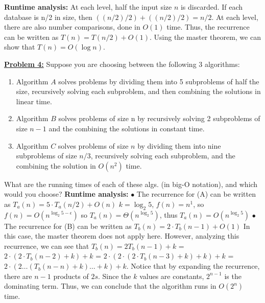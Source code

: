 \documentclass[11pt]{article}
\begin{document}
\begin{flushleft}
		\newline
		\newline
		\textbf{Runtime analysis:} At each level, half the input size $n$ is discarded. If each database is n/2 in size, then $((n/2) / 2) + ((n/2) / 2) = n/2$. At each level, there are also number comparisons, done in $O(1)$ time. Thus, the recurrence can be written as $T(n) = T(n/2) + O(1)$. Using the master theorem, we can show that $T(n) = O(\log n)$.
		\newline
		\item \textbf {\underline{Problem 4:}} Suppose you are choosing between the following 3 algorithms:
		\begin{enumerate}
			\item Algorithm $A$ solves problems by dividing them into 5 subproblems of half the size, recursively solving each subproblem, and then combining the solutions in linear time.
			\item Algorithm $B$ solves problems of size n by recursively solving 2 subproblems of size $n-1$ and the combining the solutions in constant time.
			\item Algorithm $C$ solves problems of size $n$ by dividing them into nine subproblems of size $n/3$, recursively solving each subproblem, and the combining the solution in $O(n^2)$ time.
		\end{enumerate}
		What are the running times of each of these algs. (in big-O notation), and which would you choose?
		\newline
		\newpage
		\textbf{Runtime analysis:} 
		\newline
		$\bullet$ The recurrence for (A) can be written as $T_a(n) = 5 \cdot T_a(n/2) + O(n)$
		\newline
		$k = \log_2 5$, $f(n) = n^1$, so $f(n) = O(n^{\log_2 5 - \epsilon})$ so
		$T_a(n) = \Theta(n^{\log_2 5})$, thus $T_a(n) = O(n^{\log_2 5})$
		\newline
		$\bullet$ The recurrence for (B) can be written as $T_b(n) = 2 \cdot T_b(n - 1) + O(1)$
		\newline
		In this case, the master theorem does not apply here. However, analyzing this recurrence, we can see that $T_b(n) = 2T_b(n -1) + k$ = $2\cdot(2\cdot T_b(n - 2) + k) +k$ = $2 \cdot (2 \cdot (2 \cdot T_b(n - 3) +k) +k) +k$ = \newline 
		$2 \cdot (2 \dots (T_b(n - n) +k)\dots +k) +k$. Notice that by expanding the recurrence, there are $n - 1$ products of $2s$. Since the $k$ values are constants, $2^{n-1}$ is the dominating term. Thus, we can conclude that the algorithm runs in $O(2^{n})$ time. \newline

\end{flushleft}
\end{document}
